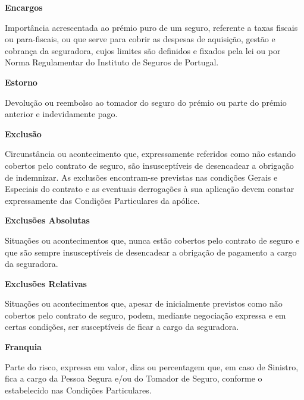 \begin{description}
\item \textbf{Encargos}

Importância acrescentada ao prémio puro de um seguro, referente a taxas fiscais ou para-fiscais, ou que serve para cobrir as despesas de aquisição, gestão e cobrança da seguradora, cujos limites são definidos e fixados pela lei ou por Norma Regulamentar do Instituto de Seguros de Portugal.\end{description}

\begin{description}
\item \textbf{Estorno}

Devolução ou reembolso ao tomador do seguro do prémio ou parte do prémio anterior e indevidamente pago.
\end{description}

\begin{description}
\item \textbf{Exclusão}

Circunstância ou acontecimento que, expressamente referidos como não estando cobertos pelo contrato de seguro, são insusceptíveis de desencadear a obrigação de indemnizar. As exclusões encontram-se previstas nas condições Gerais e Especiais do contrato e as eventuais derrogações à sua aplicação devem constar expressamente das Condições Particulares da apólice.
\end{description}

\begin{description}
\item \textbf{Exclusões Absolutas}

Situações ou acontecimentos que, nunca estão cobertos pelo contrato de seguro e que são sempre insusceptíveis de desencadear a obrigação de pagamento a cargo da seguradora.
\end{description}

\begin{description}
\item \textbf{Exclusões Relativas}

Situações ou acontecimentos que, apesar de inicialmente previstos como não cobertos pelo contrato de seguro, podem, mediante negociação expressa e em certas condições, ser susceptíveis de ficar a cargo da seguradora.
\end{description}

\begin{description}
\item \textbf{Franquia}

Parte do risco, expressa em valor, dias ou percentagem que, em caso de Sinistro, fica a cargo da Pessoa Segura e/ou do Tomador de Seguro, conforme o estabelecido nas Condições Particulares.
\end{description}

